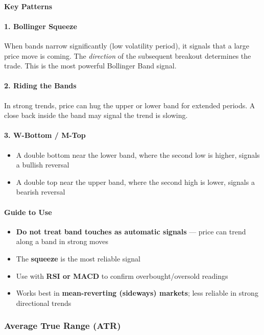\documentclass[12pt,openany]{book}
\begin{document}
\paragraph{Key Patterns}

\paragraph{1. Bollinger Squeeze}
When bands narrow significantly (low volatility period), it signals that a large price move is coming. The \emph{direction} of the subsequent breakout determines the trade. This is the most powerful Bollinger Band signal.

\paragraph{2. Riding the Bands}
In strong trends, price can hug the upper or lower band for extended periods. A close back inside the band may signal the trend is slowing.

\paragraph{3. W-Bottom / M-Top}
\begin{itemize}[leftmargin=*]
    \item A double bottom near the lower band, where the second low is higher, signals a bullish reversal
    \item A double top near the upper band, where the second high is lower, signals a bearish reversal
\end{itemize}

\paragraph{Guide to Use}
\begin{itemize}[leftmargin=*]
    \item \textbf{Do not treat band touches as automatic signals} --- price can trend along a band in strong moves
    \item The \textbf{squeeze} is the most reliable signal
    \item Use with \textbf{RSI or MACD} to confirm overbought/oversold readings
    \item Works best in \textbf{mean-reverting (sideways) markets}; less reliable in strong directional trends
\end{itemize}

\subsubsection{Average True Range (ATR)}
\end{document}
